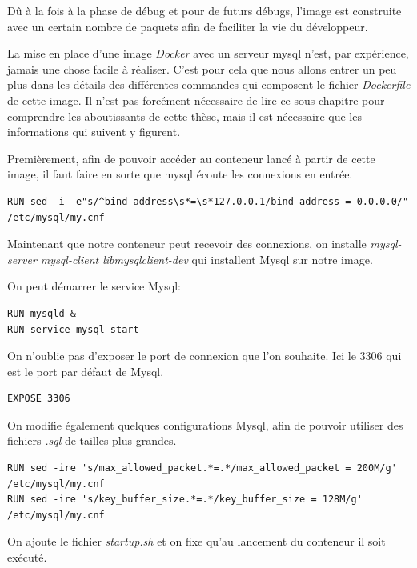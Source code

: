 Dû à la fois à la phase de débug et pour de futurs débugs, l'image est construite avec un certain nombre de paquets afin de faciliter la vie du développeur.

La mise en place d'une image \emph{Docker} avec un serveur mysql n'est, par expérience, jamais une chose facile à réaliser. C'est pour cela que nous allons entrer un peu plus dans les détails des différentes commandes qui composent le fichier \emph{Dockerfile} de cette image. Il n'est pas forcément nécessaire de lire ce sous-chapitre pour comprendre les aboutissants de cette thèse, mais il est nécessaire que les informations qui suivent y figurent.

Premièrement, afin de pouvoir accéder au conteneur lancé à partir de cette image, il faut faire en sorte que mysql écoute les connexions en entrée.

\lstset{language=bash}

\begin{lstlisting}[frame=single]
RUN sed -i -e"s/^bind-address\s*=\s*127.0.0.1/bind-address = 0.0.0.0/" /etc/mysql/my.cnf
\end{lstlisting}

Maintenant que notre conteneur peut recevoir des connexions, on installe \emph{mysql-server mysql-client libmysqlclient-dev} qui installent Mysql sur notre image.

On peut démarrer le service Mysql:

\begin{lstlisting}[frame=single]
RUN mysqld &
RUN service mysql start
\end{lstlisting}

On n’oublie pas d'exposer le port de connexion que l'on souhaite. Ici le 3306 qui est le port par défaut de Mysql.

\begin{lstlisting}[frame=single]
EXPOSE 3306
\end{lstlisting}

On modifie également quelques configurations Mysql, afin de pouvoir utiliser des fichiers \emph{.sql} de tailles plus grandes.

\begin{lstlisting}[frame=single]
RUN sed -ire 's/max_allowed_packet.*=.*/max_allowed_packet = 200M/g' /etc/mysql/my.cnf
RUN sed -ire 's/key_buffer_size.*=.*/key_buffer_size = 128M/g' /etc/mysql/my.cnf
\end{lstlisting}

On ajoute le fichier \emph{startup.sh} et on fixe qu'au lancement du conteneur il soit exécuté.

